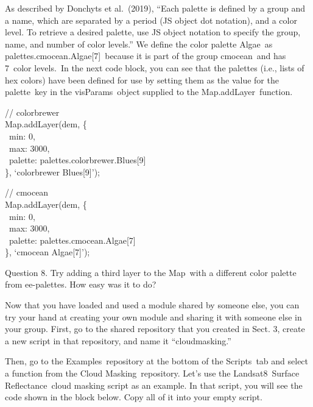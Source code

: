 \documentclass[
  letterpaper,
  DIV=11,
  numbers=noendperiod]{scrreprt}
\begin{document}
As described by Donchyts et al.~(2019), ``Each palette is defined by a
group and a name, which are separated by a period (JS object dot
notation), and a color level. To retrieve a desired palette, use JS
object notation to specify the group, name, and number of color
levels.'' We define the color palette Algae~as
palettes.cmocean.Algae{[}7{]}~because it is part of the group
cmocean~and has 7~color levels.~In the next code block, you can see that
the palettes (i.e., lists of hex colors) have been defined for use by
setting them as the value for the palette~key in the visParams~object
supplied to the Map.addLayer~function.

// colorbrewer\\
Map.addLayer(dem, \{\\
\hspace*{0.333em} ~min: 0,\\
\hspace*{0.333em} ~max: 3000,\\
\hspace*{0.333em} ~palette: palettes.colorbrewer.Blues{[}9{]}\\
\}, `colorbrewer Blues{[}9{]}');

// cmocean\\
Map.addLayer(dem, \{\\
\hspace*{0.333em} ~min: 0,\\
\hspace*{0.333em} ~max: 3000,\\
\hspace*{0.333em} ~palette: palettes.cmocean.Algae{[}7{]}\\
\}, `cmocean Algae{[}7{]}');

Question 8. Try adding a third layer to the Map~with a different color
palette from ee-palettes. How easy was it to do?

Now that you have loaded and used a module shared by someone else, you
can try your hand at creating your own module and sharing it with
someone else in your group. First, go to the shared repository that you
created in Sect. 3, create a new script in that repository, and name it
``cloudmasking.''

Then, go to the Examples~repository at the bottom of the Scripts~tab and
select a function from the Cloud Masking~repository. Let's use the
Landsat8~Surface Reflectance~cloud masking script as an example. In that
script, you will see the code shown in the block below. Copy all of it
into your empty script. ~
\end{document}
